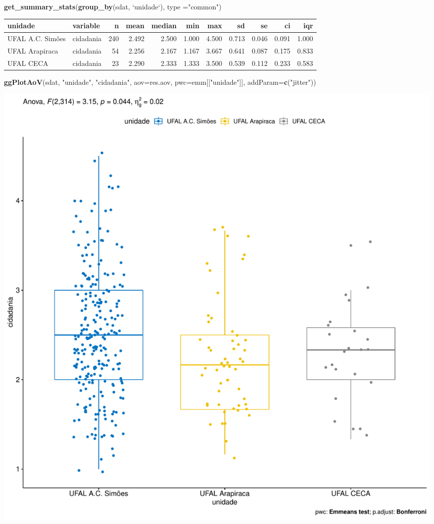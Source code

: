 \documentclass[]{article}
\newenvironment{Shaded}{\begin{snugshade}}{\end{snugshade}}
\newcommand{\DataTypeTok}[1]{\textcolor[rgb]{0.13,0.29,0.53}{#1}}
\newcommand{\KeywordTok}[1]{\textcolor[rgb]{0.13,0.29,0.53}{\textbf{#1}}}
\newcommand{\NormalTok}[1]{#1}
\newcommand{\StringTok}[1]{\textcolor[rgb]{0.31,0.60,0.02}{#1}}
\begin{document}
\begin{Shaded}
\begin{Highlighting}[]
\KeywordTok{get_summary_stats}\NormalTok{(}\KeywordTok{group_by}\NormalTok{(sdat, }\StringTok{`}\DataTypeTok{unidade}\StringTok{`}\NormalTok{), }\DataTypeTok{type =}\StringTok{"common"}\NormalTok{)}
\end{Highlighting}
\end{Shaded}

\begin{longtable}[]{@{}llrrrrrrrrr@{}}
\toprule
unidade & variable & n & mean & median & min & max & sd & se & ci &
iqr\tabularnewline
\midrule
\endhead
UFAL A.C. Simões & cidadania & 240 & 2.492 & 2.500 & 1.000 & 4.500 &
0.713 & 0.046 & 0.091 & 1.000\tabularnewline
UFAL Arapiraca & cidadania & 54 & 2.256 & 2.167 & 1.167 & 3.667 & 0.641
& 0.087 & 0.175 & 0.833\tabularnewline
UFAL CECA & cidadania & 23 & 2.290 & 2.333 & 1.333 & 3.500 & 0.539 &
0.112 & 0.233 & 0.583\tabularnewline
\bottomrule
\end{longtable}

\begin{Shaded}
\begin{Highlighting}[]
\KeywordTok{ggPlotAoV}\NormalTok{(sdat, }\StringTok{"unidade"}\NormalTok{, }\StringTok{"cidadania"}\NormalTok{, }\DataTypeTok{aov=}\NormalTok{res.aov, }\DataTypeTok{pwc=}\NormalTok{emm[[}\StringTok{"unidade"}\NormalTok{]], }\DataTypeTok{addParam=}\KeywordTok{c}\NormalTok{(}\StringTok{"jitter"}\NormalTok{))}
\end{Highlighting}
\end{Shaded}

\includegraphics{factorialAnova_files/figure-latex/unnamed-chunk-24-1.pdf}
\end{document}
